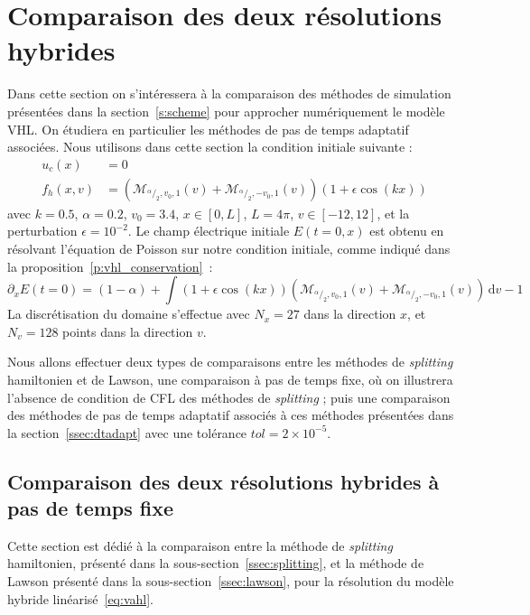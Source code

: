 
\section{Comparaison des deux résolutions hybrides}
\label{s:compare}

Dans cette section on s'intéressera à la comparaison des méthodes de simulation présentées dans la section~\ref{s:scheme} pour approcher numériquement le modèle VHL. On étudiera en particulier les méthodes de pas de temps adaptatif associées. Nous utilisons dans cette section la condition initiale suivante :
$$
  \begin{aligned}
    u_c(x)   &= 0 \\
    f_h(x,v) &=  \left(\mathcal{M}_{^\alpha/_2,v_0,1}(v) +  \mathcal{M}_{^\alpha/_2,-v_0,1}(v) \right)(1 + \epsilon\cos(kx))
  \end{aligned}
$$
avec $k=0.5$, $\alpha=0.2$, $v_0 = 3.4$, $x\in [0,L]$, $L=4\pi$, $v\in[-12,12]$, et la perturbation $\epsilon = 10^{-2}$. Le champ électrique initiale $E(t=0,x)$ est obtenu en résolvant l'équation de Poisson sur notre condition initiale, comme indiqué dans la proposition~\ref{p:vhl_conservation}~:
$$
  \partial_x E(t=0) = (1-\alpha) + \int (1+\epsilon\cos(kx))\left( \mathcal{M}_{^\alpha/_2,v_0,1}(v) + \mathcal{M}_{^\alpha/_2,-v_0,1}(v) \right)\,\mathrm{d}v - 1
$$
La discrétisation du domaine s'effectue avec $N_x=27$ dans la direction $x$, et $N_v=128$ points dans la direction $v$.

Nous allons effectuer deux types de comparaisons entre les méthodes de \emph{splitting} hamiltonien et de Lawson, une comparaison à pas de temps fixe, où on illustrera l'absence de condition de CFL des méthodes de \emph{splitting} ; puis une comparaison des méthodes de pas de temps adaptatif associés à ces méthodes présentées dans la section~\ref{ssec:dtadapt} avec une tolérance $tol = 2\times10^{-5}$.

\subsection{Comparaison des deux résolutions hybrides à pas de temps fixe}

Cette section est dédié à la comparaison entre la méthode de \emph{splitting} hamiltonien, présenté dans la sous-section~\ref{ssec:splitting}, et la méthode de Lawson présenté dans la sous-section~\ref{ssec:lawson}, pour la résolution du modèle hybride linéarisé~\eqref{eq:vahl}.


